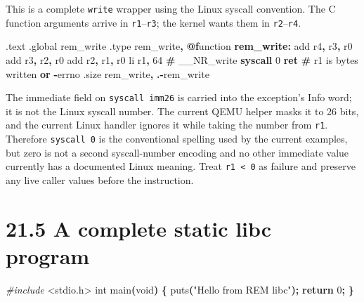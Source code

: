 \documentclass[
  oneside,
  openany]{book}
\newenvironment{Shaded}{\begin{snugshade}}{\end{snugshade}}
\newcommand{\BuiltInTok}[1]{#1}
\newcommand{\ControlFlowTok}[1]{\textcolor[rgb]{0.13,0.29,0.53}{\textbf{#1}}}
\newcommand{\DataTypeTok}[1]{\textcolor[rgb]{0.13,0.29,0.53}{#1}}
\newcommand{\DecValTok}[1]{\textcolor[rgb]{0.00,0.00,0.81}{#1}}
\newcommand{\FunctionTok}[1]{\textcolor[rgb]{0.13,0.29,0.53}{\textbf{#1}}}
\newcommand{\ImportTok}[1]{#1}
\newcommand{\NormalTok}[1]{#1}
\newcommand{\OperatorTok}[1]{\textcolor[rgb]{0.81,0.36,0.00}{\textbf{#1}}}
\newcommand{\PreprocessorTok}[1]{\textcolor[rgb]{0.56,0.35,0.01}{\textit{#1}}}
\newcommand{\StringTok}[1]{\textcolor[rgb]{0.31,0.60,0.02}{#1}}
\begin{document}
This is a complete \texttt{write} wrapper using the Linux syscall
convention. The C function arguments arrive in \texttt{r1}--\texttt{r3};
the kernel wants them in \texttt{r2}--\texttt{r4}.

\begin{Shaded}
\begin{Highlighting}[]
\NormalTok{.text}
\NormalTok{.global rem\_write}
\NormalTok{.type rem\_write}\OperatorTok{,} \FunctionTok{@f}\NormalTok{unction}
\FunctionTok{rem\_write:}
        \BuiltInTok{add}\NormalTok{ r4}\OperatorTok{,}\NormalTok{ r3}\OperatorTok{,}\NormalTok{ r0}
        \BuiltInTok{add}\NormalTok{ r3}\OperatorTok{,}\NormalTok{ r2}\OperatorTok{,}\NormalTok{ r0}
        \BuiltInTok{add}\NormalTok{ r2}\OperatorTok{,}\NormalTok{ r1}\OperatorTok{,}\NormalTok{ r0}
\NormalTok{        li  r1}\OperatorTok{,} \DecValTok{64}          \OperatorTok{\#}\NormalTok{ \_\_NR\_write}
        \ControlFlowTok{syscall} \DecValTok{0}
        \ControlFlowTok{ret}                 \OperatorTok{\#}\NormalTok{ r1 is bytes written }\OperatorTok{or} \OperatorTok{{-}}\NormalTok{errno}
\NormalTok{.size rem\_write}\OperatorTok{,} \OperatorTok{.{-}}\NormalTok{rem\_write}
\end{Highlighting}
\end{Shaded}

The immediate field on \texttt{syscall\ imm26} is carried into the
exception's Info word; it is not the Linux syscall number. The current
QEMU helper masks it to 26 bits, and the current Linux handler ignores
it while taking the number from \texttt{r1}. Therefore
\texttt{syscall\ 0} is the conventional spelling used by the current
examples, but zero is not a second syscall-number encoding and no other
immediate value currently has a documented Linux meaning. Treat
\texttt{r1\ \textless{}\ 0} as failure and preserve any live caller
values before the instruction.

\hypertarget{a-complete-static-libc-program}{%
\section{21.5 A complete static libc
program}\label{a-complete-static-libc-program}}

\begin{Shaded}
\begin{Highlighting}[]
\PreprocessorTok{\#include }\ImportTok{\textless{}stdio.h\textgreater{}}
\DataTypeTok{int}\NormalTok{ main}\OperatorTok{(}\DataTypeTok{void}\OperatorTok{)} \OperatorTok{\{}
\NormalTok{    puts}\OperatorTok{(}\StringTok{"Hello from REM libc"}\OperatorTok{);}
    \ControlFlowTok{return} \DecValTok{0}\OperatorTok{;}
\OperatorTok{\}}
\end{Highlighting}
\end{Shaded}
\end{document}
